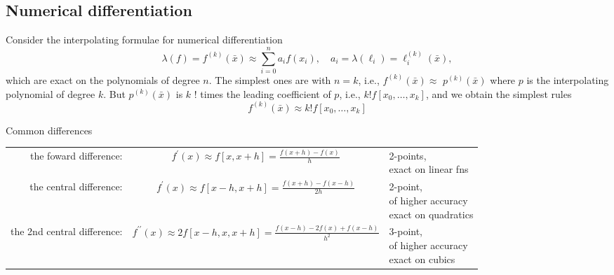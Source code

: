 \documentclass[a4paper]{article}
\begin{document}
\subsection{Numerical differentiation}
Consider the interpolating formulae for numerical differentiation
\[
\lambda(f)=f^{(k)}(\bar{x}) \approx \sum_{i=0}^n a_i f\left(x_i\right), \quad a_i=\lambda\left(\ell_i\right)=\ell_i^{(k)}(\bar{x}),
\]
which are exact on the polynomials of degree $n$. The simplest ones are with $n=k$, i.e., $f^{(k)}(\bar{x}) \approx$ $p^{(k)}(\bar{x})$ where $p$ is the interpolating polynomial of degree $k$. But $p^{(k)}(\bar{x})$ is $k$ ! times the leading coefficient of $p$, i.e., $k ! f\left[x_0, \ldots, x_k\right]$, and we obtain the simplest rules
\[
f^{(k)}(\bar{x}) \approx k ! f\left[x_0, \ldots, x_k\right]
\]
\begin{example}
    Common differences 
    \begin{center}
        \begin{tabular}{rcl}
            the foward difference: & $\displaystyle  f^{\prime}(x) \approx f[x, x+h]=\frac{f(x+h)-f(x)}{h} $ & \parbox{3cm}{2-points,\\ exact on linear fns}\\[2em] 
            the central difference: & $\displaystyle f^{\prime}(x) \approx f[x-h, x+h]=\frac{f(x+h)-f(x-h)}{2 h} $ & \parbox{3cm}{2-point,\\ of higher accuracy\\ exact on quadratics}\\[2em] 
            the 2nd central difference: & $\displaystyle f^{\prime \prime}(x) \approx 2 f[x-h, x, x+h]=\frac{f(x-h)-2 f(x)+f(x-h)}{h^2}$ & \parbox{3cm}{3-point,\\ of higher accuracy\\ exact on cubics}
        \end{tabular}
    \end{center}
\end{example}
\end{document}

